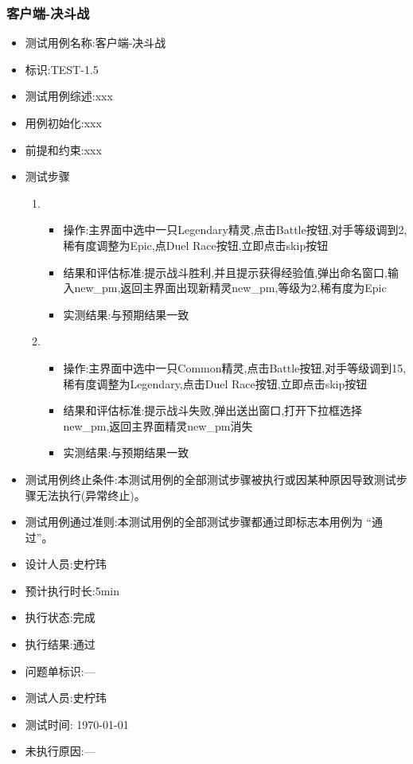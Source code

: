 \documentclass{article}
\begin{document}
\subsubsection{客户端-决斗战}
\begin{itemize}
\item 测试用例名称:客户端-决斗战
\item 标识:TEST-1.5
\item 测试用例综述:xxx
\item 用例初始化:xxx
\item 前提和约束:xxx
\item 测试步骤
  \begin{enumerate}
  \item
    \begin{itemize}
    \item 操作:主界面中选中一只Legendary精灵,点击Battle按钮,对手等级调到2,稀有度调整为Epic,点Duel Race按钮,立即点击skip按钮
    \item 结果和评估标准:提示战斗胜利,并且提示获得经验值,弹出命名窗口,输入new\_pm,返回主界面出现新精灵new\_pm,等级为2,稀有度为Epic
    \item 实测结果:与预期结果一致
    \end{itemize}

  \item
    \begin{itemize}
    \item 操作:主界面中选中一只Common精灵,点击Battle按钮,对手等级调到15,稀有度调整为Legendary,点击Duel Race按钮,立即点击skip按钮
    \item 结果和评估标准:提示战斗失败,弹出送出窗口,打开下拉框选择new\_pm,返回主界面精灵new\_pm消失
    \item 实测结果:与预期结果一致
    \end{itemize}

  \end{enumerate}
\item 测试用例终止条件:本测试用例的全部测试步骤被执行或因某种原因导致测试步骤无法执行(异常终止)。
\item 测试用例通过准则:本测试用例的全部测试步骤都通过即标志本用例为 “通过”。
\item 设计人员:史柠玮
\item 预计执行时长:5min
\item 执行状态:完成
\item 执行结果:通过
\item 问题单标识:---
\item 测试人员:史柠玮
\item 测试时间: \today
\item 未执行原因:---
\end{itemize}
\end{document}
